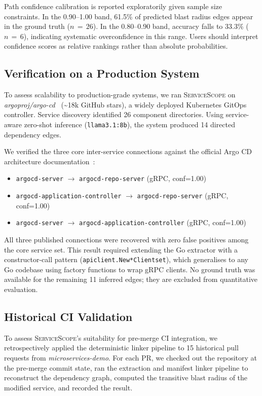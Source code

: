 \documentclass[runningheads]{llncs}
\begin{document}
Path confidence calibration is reported exploratorily given sample size
constraints. In the 0.90--1.00 band, 61.5\% of predicted blast radius edges
appear in the ground truth ($n\,=\,26$). In the 0.80--0.90 band, accuracy
falls to 33.3\% ($n\,=\,6$), indicating systematic overconfidence in this
range. Users should interpret confidence scores as relative rankings rather
than absolute probabilities.

\subsection{Verification on a Production System}
\label{sec:argocd}

To assess scalability to production-grade systems, we ran
\textsc{ServiceScope} on \emph{argoproj/argo-cd}~\cite{argocd}
(\textasciitilde18k GitHub stars), a widely deployed Kubernetes GitOps
controller. Service discovery identified 26 component directories. Using
service-aware zero-shot inference (\texttt{llama3.1:8b}), the system
produced 14 directed dependency edges.

We verified the three core inter-service connections against the official
Argo CD architecture documentation~\cite{argocd-arch}:

\begin{itemize}
  \item \texttt{argocd-server} $\to$ \texttt{argocd-repo-server} (gRPC, conf=1.00) \checkmark
  \item \texttt{argocd-application-controller} $\to$ \texttt{argocd-repo-server} (gRPC, conf=1.00) \checkmark
  \item \texttt{argocd-server} $\to$ \texttt{argocd-application-controller} (gRPC, conf=1.00) \checkmark
\end{itemize}

All three published connections were recovered with zero false positives
among the core service set. This result required extending the Go extractor
with a constructor-call pattern (\texttt{apiclient.New*Clientset}), which
generalises to any Go codebase using factory functions to wrap gRPC clients.
No ground truth was available for the remaining 11 inferred edges; they are
excluded from quantitative evaluation.

\subsection{Historical CI Validation}
\label{sec:historical}

To assess \textsc{ServiceScope}'s suitability for pre-merge CI integration,
we retrospectively applied the deterministic linker pipeline to 15 historical
pull requests from \emph{microservices-demo}. For each PR, we checked out the
repository at the pre-merge commit state, ran the extraction and manifest
linker pipeline to reconstruct the dependency graph, computed the transitive
blast radius of the modified service, and recorded the result.
\end{document}

